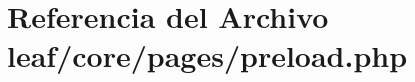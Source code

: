 \hypertarget{leaf_2core_2pages_2preload_8php}{\section{Referencia del Archivo leaf/core/pages/preload.php}
\label{leaf_2core_2pages_2preload_8php}
}
